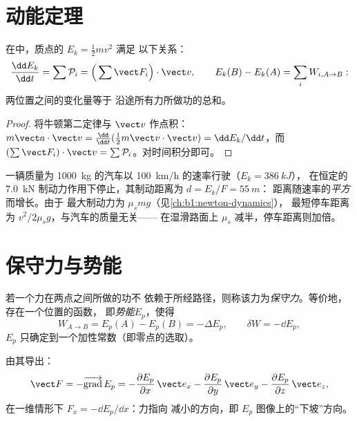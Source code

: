 \section{动能定理}

\begin{theorem}[动能定理与功率定理]\label{thm:b1:work-and-energy:ke}
在中，质点的\emph{} $E_k = \tfrac12 mv^2$ 满足
以下关系：
\[
\frac{\dd E_k}{\dd t} = \sum\mathcal P_i = \Big(\sum\vect F_i\Big)\cdot\vect v,
\qquad
E_k(B) - E_k(A) = \sum_i W_{i,A\to B}:
\]
两位置之间的变化量等于
沿途所有力所做功的总和。
\end{theorem}

\begin{proof}
将牛顿第二定律与 $\vect v$ 作点积：$m\vect a\cdot\vect v =
\tfrac{\dd}{\dd t}(\tfrac12 m\vect v\cdot\vect v) = \dd E_k/\dd t$，而
$(\sum\vect F_i)\cdot\vect v = \sum\mathcal P_i$。对时间积分即可。
\end{proof}

\begin{example}[制动距离]\label{ex:b1:work-and-energy:braking}
一辆质量为 \qty{1000}{kg} 的汽车以 \qty{100}{km/h} 的速率行驶（$E_k = \qty{386}{kJ}$），
在恒定的 \qty{7.0}{kN} 制动力作用下停止，其制动距离为 $d = E_k/F = \qty{55}{m}$：
距离随速率的\emph{平方}而增长。由于
最大制动力为 $\mu_smg$（见\cref{ch:b1:newton-dynamics}），
最短停车距离为 $v^2/2\mu_sg$，与汽车的质量无关——
在湿滑路面上 $\mu_s$ 减半，停车距离则加倍。
\end{example}

\section{保守力与势能}

\begin{definition}[保守力；势能]\label{def:b1:work-and-energy:conservative}
若一个力在两点之间所做的功不
依赖于所经路径，则称该力为\emph{保守力}。等价地，存在一个位置的函数，
即\emph{势能}$E_p$，使得
\[
W_{A\to B} = E_p(A) - E_p(B) = -\Delta E_p ,
\qquad \delta W = -\dd E_p ,
\]
$E_p$ 只确定到一个加性常数（即零点的选取）。
\end{definition}

\begin{proposition}[由势能求力]\label{prop:b1:work-and-energy:gradient}
由其导出：
\[
\vect F = -\overrightarrow{\operatorname{grad}}\,E_p
= -\frac{\partial E_p}{\partial x}\,\vect e_x
- \frac{\partial E_p}{\partial y}\,\vect e_y
- \frac{\partial E_p}{\partial z}\,\vect e_z ,
\]
在一维情形下 $F_x = -\dd E_p/\dd x$：力指向
减小的方向，即 $E_p$ 图像上的“下坡”方向。
\end{proposition}


